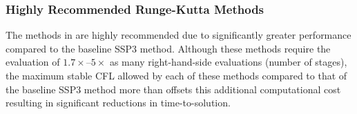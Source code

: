 \subsubsection{Highly Recommended Runge-Kutta Methods}
\label{SEC:Time:Methods:Recommended}

The methods in  are highly recommended due to
significantly greater performance compared to the baseline SSP3 method.
%
Although these methods require the evaluation of $1.7\times$--$5\times$ as many
right-hand-side evaluations (\thatis number of stages), the maximum stable CFL
allowed by each of these methods compared to that of the baseline SSP3 method 
more than offsets this additional computational cost resulting in significant
reductions in time-to-solution.

\FINALFIX{\newpage}


